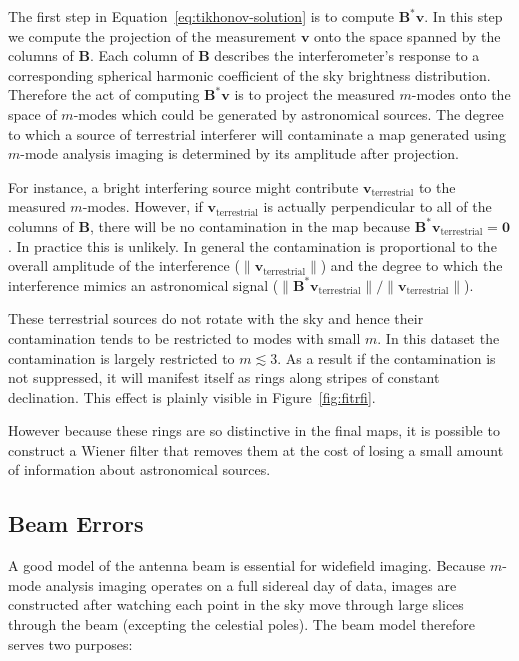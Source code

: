 \documentclass[twocolumn]{aastex61}
\renewcommand{\b}{\pmb}
\newcommand{\todo}[1]{\textcolor{red}{TODO: #1}\PackageWarning{TODO:}{#1!}}
\begin{document}
The first step in Equation~\ref{eq:tikhonov-solution} is to compute $\b B^*\b v$. In this step we
compute the projection of the measurement $\b v$ onto the space spanned by the columns of $\b B$.
Each column of $\b B$ describes the interferometer's response to a corresponding spherical harmonic
coefficient of the sky brightness distribution. Therefore the act of computing $\b B^*\b v$ is to
project the measured $m$-modes onto the space of $m$-modes which could be generated by astronomical
sources. The degree to which a source of terrestrial interferer will contaminate a map generated
using $m$-mode analysis imaging is determined by its amplitude after projection.

For instance, a bright interfering source might contribute $\b v_\text{terrestrial}$ to the measured
$m$-modes. However, if $\b v_\text{terrestrial}$ is actually perpendicular to all of the columns of
$\b B$, there will be no contamination in the map because $\b B^*\b v_\text{terrestrial} = \b 0$.
In practice this is unlikely. In general the contamination is proportional to the overall amplitude
of the interference ($\|\b v_\text{terrestrial}\|$) and the degree to which the interference mimics
an astronomical signal ($\|\b B^*\b v_\text{terrestrial}\|/\|\b v_\text{terrestrial}\|$).


These terrestrial sources do not rotate with the sky and hence their contamination tends to be
restricted to modes with small $m$. In this dataset the contamination is largely restricted to $m
\lesssim 3$. As a result if the contamination is not suppressed, it will manifest itself as rings
along stripes of constant declination. This effect is plainly visible in Figure~\ref{fig:fitrfi}.

However because these rings are so distinctive in the final maps, it is possible to construct a
Wiener filter that removes them at the cost of losing a small amount of information about
astronomical sources.


\subsection{Beam Errors}

A good model of the antenna beam is essential for widefield imaging. Because $m$-mode analysis
imaging operates on a full sidereal day of data, images are constructed after watching each point in
the sky move through large slices through the beam (excepting the celestial poles). The beam model
therefore serves two purposes:
\end{document}
